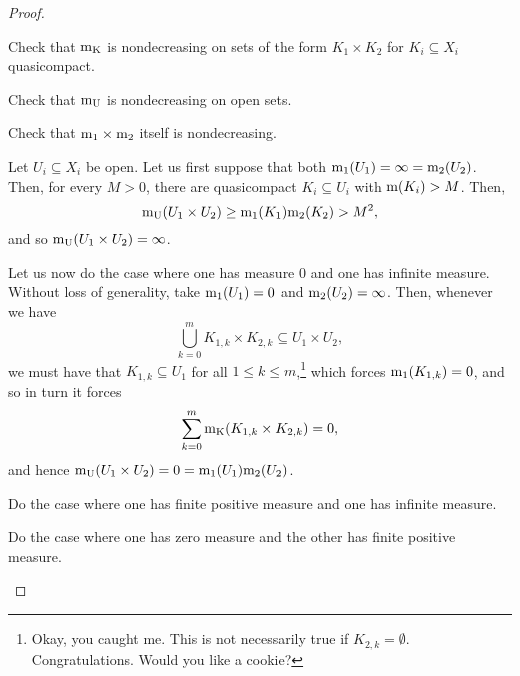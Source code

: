\begin{dfn}
\begin{prp}
\begin{savenotes}
\begin{proof}
\begin{exr}
Check that $\mathrm{m} _{\mathrm{K}}$ is nondecreasing on sets of the form $K_1\times K_2$ for $K_i\subseteq X_i$ quasicompact.
\end{exr}
\begin{exr}
Check that $\mathrm{m} _{\mathrm{U}}$ is nondecreasing on open sets.
\end{exr}
\begin{exr}
Check that $\mathrm{m} _1\times \mathrm{m} _2$ itself is nondecreasing.
\end{exr}

Let $U_i\subseteq X_i$ be open.  Let us first suppose that both $\mathrm{m} _1(U_1)=\infty =\mathrm{m} _2(U_2)$.  Then, for every $M>0$, there are quasicompact $K_i\subseteq U_i$ with $\mathrm{m} (K_i)>M$.  Then,
\begin{equation}
\mathrm{m} _{\mathrm{U}}(U_1\times U_2)\geq \mathrm{m} _1(K_1)\mathrm{m} _2(K_2)>M^2,
\end{equation}
and so $\mathrm{m} _{\mathrm{U}}(U_1\times U_2)=\infty$.

Let us now do the case where one has measure $0$ and one has infinite measure.  Without loss of generality, take $\mathrm{m} _1(U_1)=0$ and $\mathrm{m} _2(U_2)=\infty$.  Then, whenever we have
\begin{equation}
\bigcup _{k=0}^mK_{1,k}\times K_{2,k}\subseteq U_1\times U_2,
\end{equation}
we must have that $K_{1,k}\subseteq U_1$ for all $1\leq k\leq m$,\footnote{Okay, you caught me.  This is not necessarily true if $K_{2,k}=\emptyset$.  Congratulations.  Would you like a cookie?} which forces $\mathrm{m} _1(K_{1,k})=0$, and so in turn it forces
\begin{equation}
\sum _{k=0}^m\mathrm{m} _{\mathrm{K}}(K_{1,k}\times K_{2,k})=0,
\end{equation}
and hence $\mathrm{m} _{\mathrm{U}}(U_1\times U_2)=0=\mathrm{m} _1(U_1)\mathrm{m} _2(U_2)$.

\begin{exr}
Do the case where one has finite positive measure and one has infinite measure.
\end{exr}
\begin{exr}
Do the case where one has zero measure and the other has finite positive measure.
\end{exr}


\end{proof}
\end{savenotes}
\end{prp}
\end{dfn}

